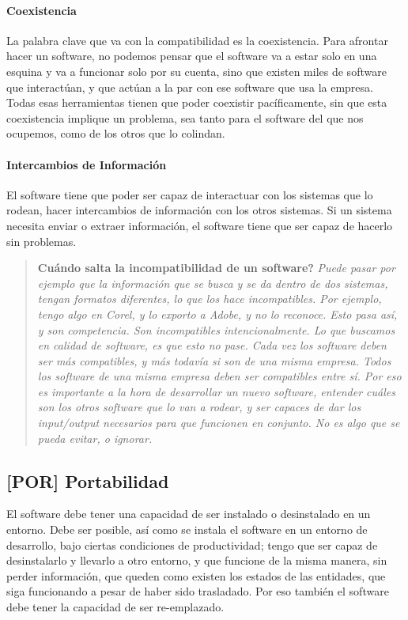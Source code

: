 \hypertarget{coexistencia}{%
\paragraph{Coexistencia}\label{coexistencia}}
La palabra clave que va con la compatibilidad
  es la coexistencia. Para afrontar hacer un software, no podemos pensar
  que el software va a estar solo en una esquina y va a funcionar solo
  por su cuenta, sino que existen miles de software que interactúan, y
  que actúan a la par con ese software que usa la empresa. Todas esas
  herramientas tienen que poder coexistir pacíficamente, sin que esta
  coexistencia implique un problema, sea tanto para el software del que
  nos ocupemos, como de los otros que lo colindan.
\hypertarget{intercambios}{%
\paragraph{Intercambios de Información}\label{intercambios}}
El software tiene que poder ser
  capaz de interactuar con los sistemas que lo rodean, hacer
  intercambios de información con los otros sistemas. Si un sistema
  necesita enviar o extraer información, el software tiene que ser capaz
  de hacerlo sin problemas.


\begin{quote}
\textbf{Cuándo salta la incompatibilidad de un software?}
\slshape{
Puede pasar
por ejemplo que la información que se busca y se da dentro de dos
sistemas, tengan formatos diferentes, lo que los hace incompatibles. Por
ejemplo, tengo algo en Corel, y lo exporto a Adobe, y no lo reconoce.
Esto pasa así, y son competencia. Son incompatibles intencionalmente. Lo
que buscamos en calidad de software, es que esto no pase. Cada vez los
software deben ser más compatibles, y más todavía si son de una misma
empresa. Todos los software de una misma empresa deben ser compatibles
entre sí. Por eso es importante a la hora de desarrollar un nuevo
software, entender cuáles son los otros software que lo van a rodear, y
ser capaces de dar los input/output necesarios para que funcionen en
conjunto. No es algo que se pueda evitar, o ignorar.}
\end{quote}

\hypertarget{portabilidad-por}{%
\subsection{%
{[}POR{]}
Portabilidad
}\label{portabilidad-por}}

El software debe tener una capacidad de ser instalado o desinstalado en
un entorno. Debe ser posible, así como se instala el software en un
entorno de desarrollo, bajo ciertas condiciones de productividad; tengo
que ser capaz de desinstalarlo y llevarlo a otro entorno, y que funcione
de la misma manera, sin perder información, que queden como existen los
estados de las entidades, que siga funcionando a pesar de haber sido
trasladado. Por eso también el software debe tener la capacidad de ser
re-emplazado.


